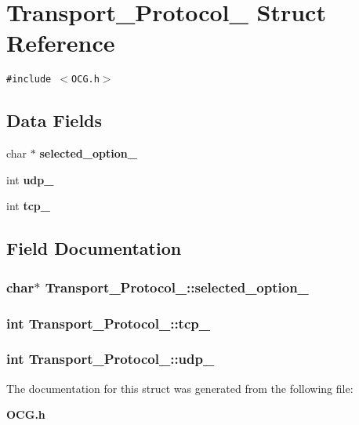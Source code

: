 \section{Transport\_\-Protocol\_\- Struct Reference}
\label{structTransport__Protocol__}
{\tt \#include $<$OCG.h$>$}

\subsection*{Data Fields}
\begin{CompactItemize}
\item 
char $\ast$ {\bf selected\_\-option\_\-}
\item 
int {\bf udp\_\-}
\item 
int {\bf tcp\_\-}
\end{CompactItemize}


\subsection{Field Documentation}
\subsubsection[{selected\_\-option\_\-}]{\setlength{\rightskip}{0pt plus 5cm}char$\ast$ {\bf Transport\_\-Protocol\_\-::selected\_\-option\_\-}}\label{structTransport__Protocol___d5520783c0612b59e7bd9c3108cc6d4b}


\subsubsection[{tcp\_\-}]{\setlength{\rightskip}{0pt plus 5cm}int {\bf Transport\_\-Protocol\_\-::tcp\_\-}}\label{structTransport__Protocol___0668c7725aafaf6a8f502b9037893ebc}


\subsubsection[{udp\_\-}]{\setlength{\rightskip}{0pt plus 5cm}int {\bf Transport\_\-Protocol\_\-::udp\_\-}}\label{structTransport__Protocol___516f27bcaf94a1a3115db08fa193e827}




The documentation for this struct was generated from the following file:\begin{CompactItemize}
\item 
{\bf OCG.h}\end{CompactItemize}
